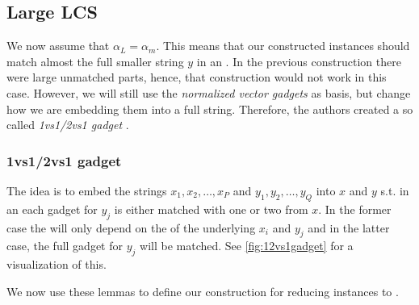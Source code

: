 \subsection{Large LCS}

We now assume that $\alpha_L = \alpha_m$.
This means that our constructed instances should match almost the full smaller string $y$ in an \lcs{}.
In the previous construction there were large unmatched parts, hence, that construction would not work in this case.
However, we will still use the \emph{normalized vector gadgets} as basis, but change how we are embedding them into a full string.
Therefore, the authors created a so called \emph{1vs1/2vs1 gadget} \cite[section 9.2.1]{Bringman.2018}.

\subsubsection{1vs1/2vs1 gadget}
The idea is to embed the strings $x_1, x_2, \ldots, x_P$ and $y_1, y_2, \ldots, y_Q$ into $x$ and $y$ s.t. in an \lcs{} each gadget for $y_j$ is either matched with one or two from $x$.
In the former case the \lcs{} will only depend on the \lcs{} of the underlying $x_i$ and $y_j$ and in the latter case, the full gadget for $y_j$ will be matched.
See \autoref{fig:12vs1gadget} for a visualization of this.













We now use these lemmas to define our construction for reducing \ov{} instances to \lcs{}.

